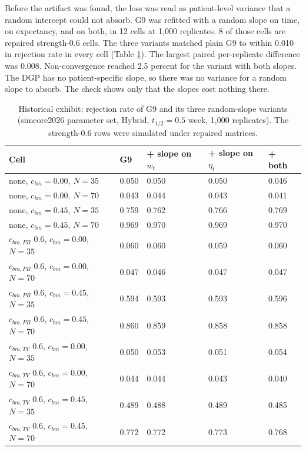 \documentclass[
  11pt,
]{article}
\newcounter{none} %
\begin{document}
Before the artifact was found, the loss was read as patient-level
variance that a random intercept could not absorb. G9 was refitted
with a random slope on time, on expectancy, and on both, in
12 cells at 1,000 replicates. 8
of those cells are repaired strength-0.6 cells. The three variants
matched plain G9 to within 0.010 in rejection rate in every
cell (Table \ref{tab:tab-re}). The largest paired per-replicate
difference was 0.008. Non-convergence reached
2.5 percent for the variant with both slopes. The DGP
has no patient-specific slope, so there was no variance for a random
slope to absorb. The check shows only that the slopes cost nothing
there.

\begin{table}
\centering
\caption{\label{tab:tab-re}Historical exhibit: rejection rate of G9 and
      its three random-slope variants (simcore2026 parameter set,
      Hybrid, $t_{1/2} = 0.5$ week, 1,000 replicates). The strength-0.6
      rows were simulated under repaired matrices.}
\centering
\fontsize{9}{11}\selectfont
\begin{tabular}[t]{lllll}
\toprule
Cell & G9 & + slope on $w_t$ & + slope on $\eta_t$ & + both\\
\midrule
none, $c_{bm} = 0.00$, $N = 35$ & 0.050 & 0.050 & 0.050 & 0.046\\
none, $c_{bm} = 0.00$, $N = 70$ & 0.043 & 0.044 & 0.043 & 0.041\\
none, $c_{bm} = 0.45$, $N = 35$ & 0.759 & 0.762 & 0.766 & 0.769\\
none, $c_{bm} = 0.45$, $N = 70$ & 0.969 & 0.970 & 0.969 & 0.970\\
$c_{bm,PB}$ 0.6, $c_{bm} = 0.00$, $N = 35$ & 0.060 & 0.060 & 0.059 & 0.060\\
$c_{bm,PB}$ 0.6, $c_{bm} = 0.00$, $N = 70$ & 0.047 & 0.046 & 0.047 & 0.047\\
$c_{bm,PB}$ 0.6, $c_{bm} = 0.45$, $N = 35$ & 0.594 & 0.593 & 0.593 & 0.596\\
$c_{bm,PB}$ 0.6, $c_{bm} = 0.45$, $N = 70$ & 0.860 & 0.859 & 0.858 & 0.858\\
$c_{bm,TV}$ 0.6, $c_{bm} = 0.00$, $N = 35$ & 0.050 & 0.053 & 0.051 & 0.054\\
$c_{bm,TV}$ 0.6, $c_{bm} = 0.00$, $N = 70$ & 0.044 & 0.044 & 0.043 & 0.040\\
$c_{bm,TV}$ 0.6, $c_{bm} = 0.45$, $N = 35$ & 0.489 & 0.488 & 0.489 & 0.485\\
$c_{bm,TV}$ 0.6, $c_{bm} = 0.45$, $N = 70$ & 0.772 & 0.772 & 0.773 & 0.768\\
\bottomrule
\end{tabular}
\end{table}
\end{document}
